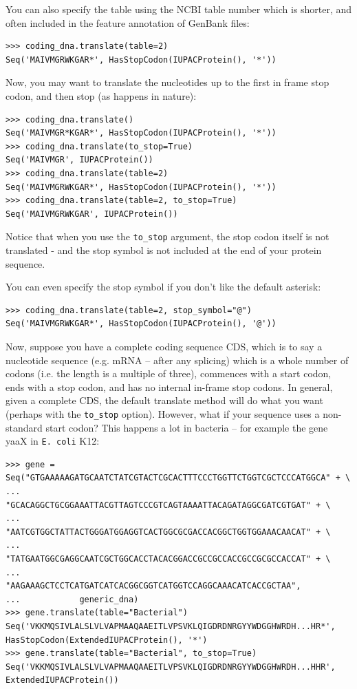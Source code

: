 \documentclass{report}
\begin{document}
You can also specify the table using the NCBI table number which is shorter, and often included in the feature annotation of GenBank files:
\begin{verbatim}
>>> coding_dna.translate(table=2)
Seq('MAIVMGRWKGAR*', HasStopCodon(IUPACProtein(), '*'))
\end{verbatim}

Now, you may want to translate the nucleotides up to the first in frame stop codon,
and then stop (as happens in nature):
\begin{verbatim}
>>> coding_dna.translate()
Seq('MAIVMGR*KGAR*', HasStopCodon(IUPACProtein(), '*'))
>>> coding_dna.translate(to_stop=True)
Seq('MAIVMGR', IUPACProtein())
>>> coding_dna.translate(table=2)
Seq('MAIVMGRWKGAR*', HasStopCodon(IUPACProtein(), '*'))
>>> coding_dna.translate(table=2, to_stop=True)
Seq('MAIVMGRWKGAR', IUPACProtein())
\end{verbatim}
\noindent Notice that when you use the \verb|to_stop| argument, the stop codon itself
is not translated - and the stop symbol is not included at the end of your protein
sequence.

You can even specify the stop symbol if you don't like the default asterisk:
\begin{verbatim}
>>> coding_dna.translate(table=2, stop_symbol="@")
Seq('MAIVMGRWKGAR*', HasStopCodon(IUPACProtein(), '@'))
\end{verbatim}

Now, suppose you have a complete coding sequence CDS, which is to say a
nucleotide sequence (e.g. mRNA -- after any splicing) which is a whole number
of codons (i.e. the length is a multiple of three), commences with a start
codon, ends with a stop codon, and has no internal in-frame stop codons.
In general, given a complete CDS, the default translate method will do what
you want (perhaps with the \verb|to_stop| option). However, what if your
sequence uses a non-standard start codon? This happens a lot in bacteria --
for example the gene yaaX in \texttt{E. coli} K12:

\begin{verbatim}
>>> gene = Seq("GTGAAAAAGATGCAATCTATCGTACTCGCACTTTCCCTGGTTCTGGTCGCTCCCATGGCA" + \
...            "GCACAGGCTGCGGAAATTACGTTAGTCCCGTCAGTAAAATTACAGATAGGCGATCGTGAT" + \
...            "AATCGTGGCTATTACTGGGATGGAGGTCACTGGCGCGACCACGGCTGGTGGAAACAACAT" + \
...            "TATGAATGGCGAGGCAATCGCTGGCACCTACACGGACCGCCGCCACCGCCGCGCCACCAT" + \
...            "AAGAAAGCTCCTCATGATCATCACGGCGGTCATGGTCCAGGCAAACATCACCGCTAA",
...            generic_dna)
>>> gene.translate(table="Bacterial")
Seq('VKKMQSIVLALSLVLVAPMAAQAAEITLVPSVKLQIGDRDNRGYYWDGGHWRDH...HR*',
HasStopCodon(ExtendedIUPACProtein(), '*')
>>> gene.translate(table="Bacterial", to_stop=True)
Seq('VKKMQSIVLALSLVLVAPMAAQAAEITLVPSVKLQIGDRDNRGYYWDGGHWRDH...HHR',
ExtendedIUPACProtein())
\end{verbatim}
\end{document}
